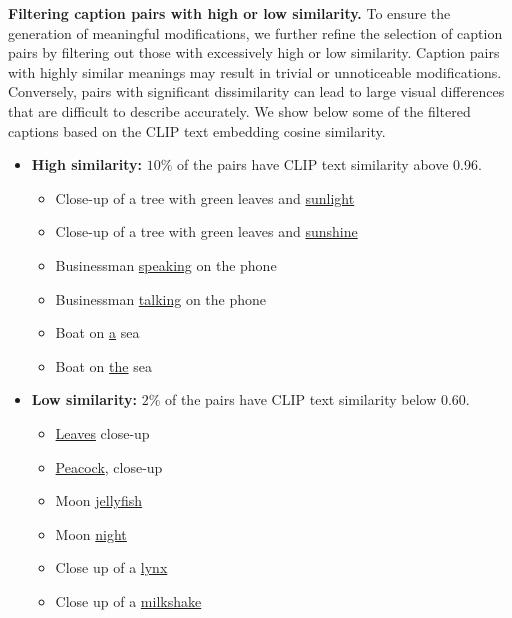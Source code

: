 \noindent\textbf{Filtering caption pairs with high or low similarity.} 
To ensure the generation of meaningful modifications, 
we further refine the selection of caption pairs by filtering out 
those with excessively high or low similarity. 
Caption pairs with highly similar meanings may result 
in trivial or unnoticeable modifications. 
Conversely, pairs with significant dissimilarity can lead to large visual 
differences that are difficult to describe accurately.
We show below some of the filtered captions based on the CLIP text embedding cosine similarity.
\begin{itemize}
    \item \textbf{High similarity:} $10\%$ of the pairs have CLIP text similarity above 0.96.
    \begin{itemize}
        \item Close-up of a tree with green leaves and \underline{sunlight}
        \item Close-up of a tree with green leaves and \underline{sunshine}
    \end{itemize}
    \begin{itemize}
        \item Businessman \underline{speaking} on the phone
        \item Businessman \underline{talking} on the phone
    \end{itemize}
    \begin{itemize}
        \item Boat on \underline{a} sea
        \item Boat on \underline{the} sea
    \end{itemize}
    \item \textbf{Low similarity:} $2\%$ of the pairs have CLIP text similarity below 0.60.
    \begin{itemize}
        \item \underline{Leaves} close-up
        \item \underline{Peacock}, close-up
    \end{itemize}
    \begin{itemize}
        \item Moon \underline{jellyfish}
        \item Moon \underline{night}
    \end{itemize}
    \begin{itemize}
        \item Close up of a \underline{lynx}
        \item Close up of a \underline{milkshake}
    \end{itemize}
\end{itemize}

